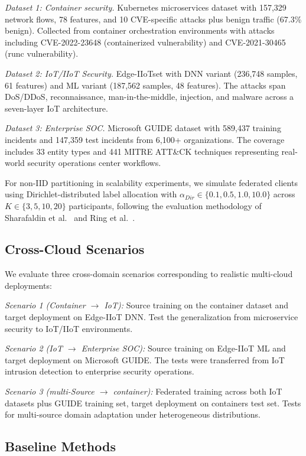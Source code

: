 \documentclass{ieeeaccess}
\theoremstyle{plain}
\theoremstyle{definition}
\theoremstyle{remark}
\begin{document}
\textit{Dataset 1: Container security.} Kubernetes microservices dataset with 157,329 network flows, 78 features, and 10 CVE-specific attacks plus benign traffic (67.3\% benign). Collected from container orchestration environments with attacks including CVE-2022-23648 (containerized vulnerability) and CVE-2021-30465 (runc vulnerability).

\textit{Dataset 2: IoT/IIoT Security.} Edge-IIoTset with DNN variant (236,748 samples, 61 features) and ML variant (187,562 samples, 48 features). The attacks span DoS/DDoS, reconnaissance, man-in-the-middle, injection, and malware across a seven-layer IoT architecture.

\textit{Dataset 3: Enterprise SOC.} Microsoft GUIDE dataset with 589,437 training incidents and 147,359 test incidents from 6,100+ organizations. The coverage includes 33 entity types and 441 MITRE ATT\&CK techniques representing real-world security operations center workflows.

For non-IID partitioning in scalability experiments, we simulate federated clients using Dirichlet-distributed label allocation with $\alpha_{Dir} \in \{0.1, 0.5, 1.0, 10.0\}$ across $K \in \{3, 5, 10, 20\}$ participants, following the evaluation methodology of Sharafaldin et al.~\cite{sharafaldin2018} and Ring et al.~\cite{ring2019}.

\subsection{Cross-Cloud Scenarios}

We evaluate three cross-domain scenarios corresponding to realistic multi-cloud deployments:

\textit{Scenario 1 (Container $\to$ IoT):} Source training on the container dataset and target deployment on Edge-IIoT DNN. Test the generalization from microservice security to IoT/IIoT environments.

\textit{Scenario 2 (IoT $\to$ Enterprise SOC):} Source training on Edge-IIoT ML and target deployment on Microsoft GUIDE. The tests were transferred from IoT intrusion detection to enterprise security operations.

\textit{Scenario 3 (multi-Source $\to$ container):} Federated training across both IoT datasets plus GUIDE training set, target deployment on containers test set. Tests for multi-source domain adaptation under heterogeneous distributions.

\subsection{Baseline Methods}
\end{document}
